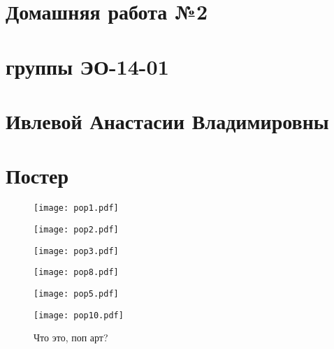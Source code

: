 \documentclass[12pt, a4paper]{article}
\begin{document}
\section*{Домашняя работа №2}
\section*{группы ЭО-14-01}
\section*{Ивлевой Анастасии Владимировны}
\section*{Постер}

\begin{figure}[h!]
\begin{center}
\begin{minipage}{0.3\linewidth}
\texttt{[image: pop1.pdf]}
\end{minipage}
\hfill
\begin{minipage}{0.3\linewidth}
\texttt{[image: pop2.pdf]}
\end{minipage}
\hfill
\begin{minipage}{0.3\linewidth}
\texttt{[image: pop3.pdf]}
\end{minipage}
\hfill
\begin{minipage}{0.3\linewidth}
\texttt{[image: pop8.pdf]}
\end{minipage}
\hfill
\begin{minipage}{0.3\linewidth}
\texttt{[image: pop5.pdf]}
\end{minipage}
\hfill
\begin{minipage}{0.3\linewidth}
\texttt{[image: pop10.pdf]}
\end{minipage}
\end{center}
\caption{Что это, поп арт?}
\end{figure}
\end{document}
